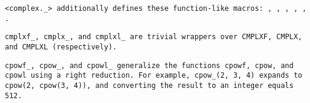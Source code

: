 \tt{<complex._>} additionally defines these function-like macros: ,
, , , , .

\tt{cmplxf_}, \tt{cmplx_}, and \tt{cmplxl_} are trivial wrappers over
\tt{CMPLXF},  \tt{CMPLX},  and \tt{CMPLXL} (respectively).

\tt{cpowf_}, \tt{cpow_}, and \tt{cpowl_} generalize the functions
\tt{cpowf},  \tt{cpow},  and \tt{cpowl} using a right reduction.
For example, \tt{cpow_(2, 3, 4)} expands to \tt{cpow(2, cpow(3, 4))},
and converting the result to an integer equals 512.

